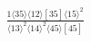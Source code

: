 \documentclass[varwidth, border=5pt]{standalone}
\begin{document}
\begin{my}
$\begin{gathered}
\scriptscriptstyle\frac{1⟨35⟩⟨12⟩[35]⟨15⟩^2}{⟨13⟩^2⟨14⟩^2⟨45⟩[45]}
\end{gathered}$
\end{my}
\end{document}
